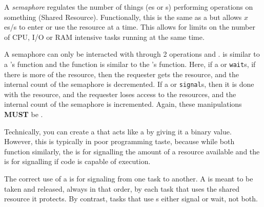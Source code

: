 \begin{definition}[Semaphore]\label{def:Semaphore}
  A \emph{semaphore} regulates the number of things (es or s) performing operations on something (Shared Resource).
  Functionally, this is the same as a  but allows $x$ es/s to enter or use the resource at a time.
  This allows for limits on the number of CPU, I/O or RAM intensive tasks running at the same time.

  A semaphore can only be interacted with through 2 operations  and .
   is similar to a 's  function and the  function is similar to the 's  function.
  Here, if a  or  \texttt{wait}s, if there is more of the resource, then the requester gets the resource, and the internal count of the semaphore is decremented.
  If a  or  \texttt{signal}s, then it is done with the resource, and the requester loses access to the resources, and the internal count of the semaphore is incremented.
  Again, these manipulations \textbf{MUST} be .

  \begin{remark}\label{rmk:Semaphore_Mutex_Confusion}
    Technically, you can create a  that acts like a  by giving it a binary value.
    However, this is typically in poor programming taste, because while both function similarly, the  is for signalling the amount of a resource available and the  is for signalling if code is capable of execution.
  \end{remark}

  \begin{remark}\label{rmk:Semaphore_Correct_Usage}
    The correct use of a  is for signaling from one task to another.
    A  is meant to be taken and released, always in that order, by each task that uses the shared resource it protects.
    By contrast, tasks that use s either signal or wait, not both.
  \end{remark}
\end{definition}

